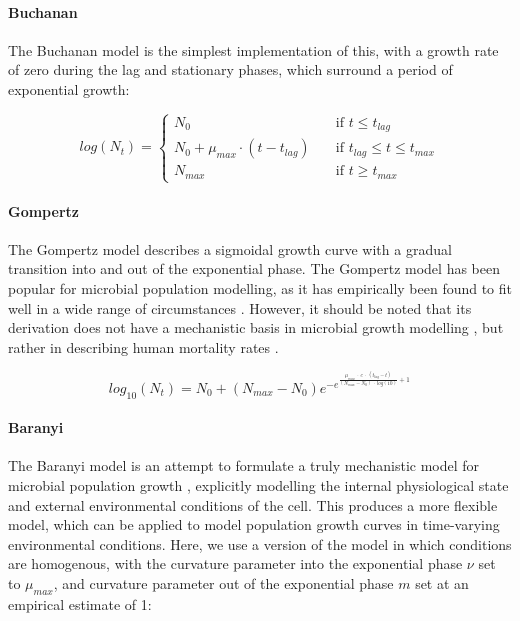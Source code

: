 \documentclass[11pt, a4paper]{article}
\begin{document}
\begin{linenumbers}
\paragraph{Buchanan}
The Buchanan model \cite{Buchanan} is the simplest implementation of this, with a growth rate of zero during the lag and stationary phases, which surround a period of exponential growth:

  \[
    log(N_t) = \begin{cases}{}
        N_0 & \quad \text{if } t\leq t_{lag}\\
        N_0 + \mu_{max} \cdot (t - t_{lag}) &  \quad \text{if } t_{lag}\leq t\leq t_{max}\\
        N_{max} &  \quad \text{if } t\geq t_{max}
        \end{cases}
  \]

\paragraph{Gompertz}

The Gompertz model \cite{Gomp, zwitmodelling} describes a sigmoidal growth curve with a gradual transition into and out of the exponential phase. The Gompertz model has been popular for microbial population modelling, as it has empirically been found to fit well in a wide range of circumstances \cite{MicrobialGrowth}. However, it should be noted that its derivation does not have a mechanistic basis in microbial growth modelling \cite{EstBaranyi}, but rather in describing human mortality rates \cite{Gomp}. 

  \[log_{10}(N_t) = N_0 + (N_{max} - N_0)  e^{-e^{ \frac{\mu_{max} ~ \cdot ~ e  ~ \cdot ~ (t_{lag} - t)}{ (N_{max} - N_0) ~ \cdot ~ log(10)} + 1} }\]
  
  
\paragraph{Baranyi}

The Baranyi model is an attempt to formulate a truly mechanistic model for microbial population growth \cite{BaranyiOriginal, zwitmodelling}, explicitly modelling the internal physiological state and external environmental conditions of the cell. This produces a more flexible model, which can be applied to model population growth curves in time-varying environmental conditions. Here,  we use a version of the model in which conditions are homogenous, with the curvature parameter into the exponential phase $\nu$ set to $\mu_{max}$, and curvature parameter out of the exponential phase $m$ set at an empirical estimate of 1:


\end{linenumbers}
\end{document}
